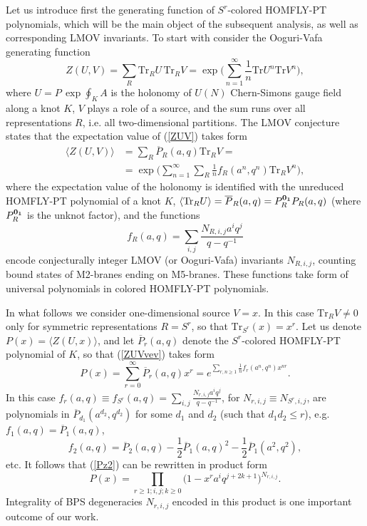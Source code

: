 \documentclass[
 reprint,
 amsmath,amssymb,
 aps,prl
]{revtex4-1}
\newcommand{\be}{\begin{equation}}
\newcommand{\ee}{\end{equation}}
\begin{document}
Let us introduce first the generating function of $S^r$-colored HOMFLY-PT polynomials, which will be the main object of the subsequent analysis, as well as corresponding LMOV invariants. To start with consider the Ooguri-Vafa generating function \cite{OoguriV,Labastida:2000zp,Labastida:2000yw,Labastida:2001ts}
\be
Z(U,V) = \sum_R  \textrm{Tr}_R U \, \textrm{Tr}_R V = \exp\Big(  \sum_{n=1}^{\infty} \frac{1}{n} \textrm{Tr} U^n \textrm{Tr} V^n \Big),   \label{ZUV}
\ee
where $U=P\,\exp\oint_K A$ is the holonomy of $U(N)$ Chern-Simons gauge field along a knot $K$, $V$ plays a role of a source, and the sum runs over all representations $R$, i.e. all two-dimensional partitions. The LMOV conjecture states that the expectation value of (\ref{ZUV}) takes  form
\begin{align}
\big\langle Z(U,V) \big\rangle &= \sum_R \overline{P}_{R}(a,q) \textrm{Tr}_R V  = \nonumber \\
&= \exp \Big(  \sum_{n=1}^\infty \sum_R \frac{1}{n} f_{R}(a^n,q^n) \textrm{Tr}_R V^n  \Big),    \label{ZUVvev}
\end{align}
where the expectation value of the holonomy is identified with the unreduced HOMFLY-PT polynomial of a knot $K$, $\langle \textrm{Tr}_R U \rangle = \overline{P}_{R}(a,q)=P_R^{\bf 0_1} P_R(a,q)$ (where $P_R^{\bf 0_1}$ is the unknot factor), and the functions 
\be
f_{R}(a,q) = \sum_{i,j} \frac{N_{R,i,j} a^i q^j}{q-q^{-1}}  \label{fR}
\ee
encode conjecturally integer LMOV (or Ooguri-Vafa) invariants $N_{R,i,j}$, counting bound states of M2-branes ending on M5-branes. These functions take form of universal polynomials in colored HOMFLY-PT polynomials.

In what follows we consider one-dimensional source $V=x$. In this case $\textrm{Tr}_R V \neq 0$ only for symmetric representations $R=S^r$, so that $\textrm{Tr}_{S^r}(x) = x^r$. Let us denote $P(x)=\langle Z(U,x) \rangle$, and let $\overline{P}_{r}(a,q)$ denote the $S^r$-colored HOMFLY-PT polynomial of $K$, so that (\ref{ZUVvev}) takes form
\be
P(x) = \sum_{r=0}^\infty \overline{P}_{r}(a,q) x^r =   
e^{\sum_{r,n\geq 1} \frac{1}{n} f_{r}(a^n,q^n)x^{n r}}.
\label{Pz2}
\ee
In this case $f_r(a,q)\equiv f_{S^r}(a,q) = \sum_{i,j} \frac{N_{r,i,j} a^i q^j}{q-q^{-1}}$, for $N_{r,i,j}\equiv N_{S^r,i,j}$, are polynomials in $\overline{P}_{d_1}(a^{d_2},q^{d_2})$ for some $d_1$ and $d_2$ (such that $d_1 d_2\leq r$), e.g. $f_1(a,q) = \overline{P}_1(a,q)$,
\be
f_2(a,q) =  \overline{P}_2(a,q) - \frac{1}{2} \overline{P}_1(a,q)^2 -\frac{1}{2}  \overline{P}_1(a^2,q^2), 
\ee
etc. It follows that (\ref{Pz2}) can be rewritten in product form
\be
P(x) = \prod_{r\geq 1;i,j;k\geq 0} \Big(1 - x^r a^i q^{j+2k+1} \Big)^{N_{r,i,j}} .
\label{Pr-LMOV} 
\ee
Integrality of BPS degeneracies $N_{r,i,j}$ encoded in this product is one important outcome of our work.
\end{document}
